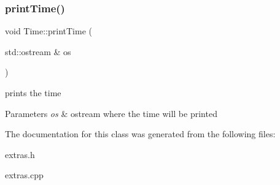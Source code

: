 \subsubsection{\texorpdfstring{print\+Time()}{printTime()}}
{\footnotesize\ttfamily void Time\+::print\+Time (\begin{DoxyParamCaption}\item[{std\+::ostream \&}]{os }\end{DoxyParamCaption})}



prints the time 


\begin{DoxyParams}{Parameters}
{\em os} & ostream where the time will be printed \\
\hline
\end{DoxyParams}


The documentation for this class was generated from the following files\+:\begin{DoxyCompactItemize}
\item 
extras.\+h\item 
extras.\+cpp\end{DoxyCompactItemize}

